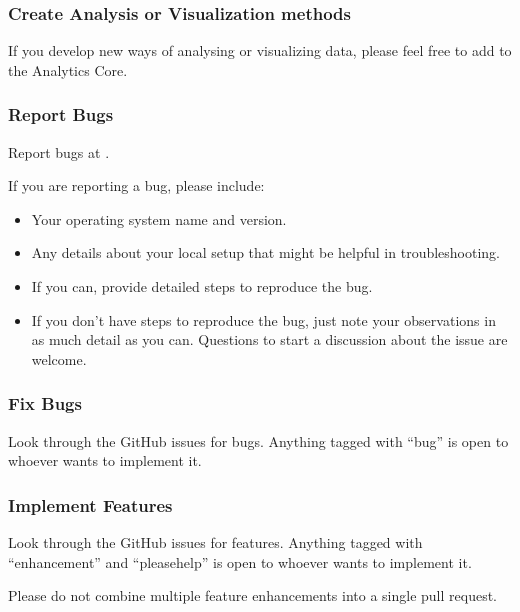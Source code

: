 \documentclass[letterpaper,10pt,english]{sphinxmanual}
\begin{document}
\subsubsection{Create Analysis or Visualization methods}
\label{\detokenize{MANIFEST:create-analysis-or-visualization-methods}}
If you develop new ways of analysing or visualizing data, please feel free to add to the Analytics Core.


\subsubsection{Report Bugs}
\label{\detokenize{MANIFEST:report-bugs}}
Report bugs at .

If you are reporting a bug, please include:
\begin{itemize}
\item {} 
Your operating system name and version.

\item {} 
Any details about your local setup that might be helpful in troubleshooting.

\item {} 
If you can, provide detailed steps to reproduce the bug.

\item {} 
If you don’t have steps to reproduce the bug, just note your observations in as much detail as you can. Questions to start a discussion about the issue are welcome.

\end{itemize}


\subsubsection{Fix Bugs}
\label{\detokenize{MANIFEST:fix-bugs}}
Look through the GitHub issues for bugs. Anything tagged with “bug” is open to whoever wants to implement it.


\subsubsection{Implement Features}
\label{\detokenize{MANIFEST:implement-features}}
Look through the GitHub issues for features. Anything tagged with “enhancement” and “please\sphinxhyphen{}help” is open to whoever wants to implement it.

Please do not combine multiple feature enhancements into a single pull request.
\end{document}
